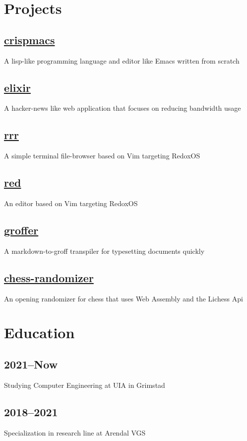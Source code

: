 \documentclass[12pt]{article}
\begin{document}
\section{Projects}

\subsection{\href{https://knarkzel.github.io/crispmacs-website/}{crispmacs}}

A lisp-like programming language and editor like Emacs written from scratch

\subsection{\href{https://github.com/knarkzel/elixir}{elixir}}

A hacker-news like web application that focuses on reducing bandwidth usage

\subsection{\href{https://github.com/knarkzel/rrr}{rrr}}

A simple terminal file-browser based on Vim targeting RedoxOS

\subsection{\href{https://knarkzel.github.io/red/}{red}}

An editor based on Vim targeting RedoxOS

\subsection{\href{https://github.com/knarkzel/groffer}{groffer}}

A markdown-to-groff transpiler for typesetting documents quickly

\subsection{\href{https://knarkzel.github.io/chess-randomizer/}{chess-randomizer}}

An opening randomizer for chess that uses Web Assembly and the
Lichess Api

\section{Education}

\subsection{2021–Now}

Studying Computer Engineering at UIA in Grimstad

\subsection{2018–2021}

Specialization in research line at Arendal VGS
\end{document}
